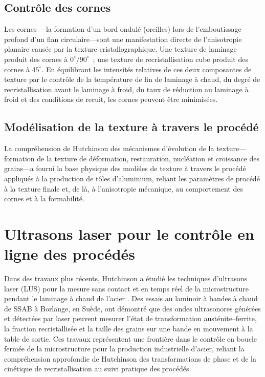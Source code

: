 \documentclass[11pt,a4paper]{article}
\begin{document}
\subsection{Contr\^ole des cornes}

Les \og cornes \fg{}---la formation d'un bord ondul\'e (oreilles) lors
de l'emboutissage profond d'un flan circulaire---sont une manifestation
directe de l'anisotropie planaire caus\'ee par la texture
cristallographique.  Une texture de laminage produit des cornes \`a
$0^\circ/90^\circ$~; une texture de recristallisation cube produit des
cornes \`a $45^\circ$.  En \'equilibrant les intensit\'es relatives de
ces deux composantes de texture par le contr\^ole de la temp\'erature de
fin de laminage \`a chaud, du degr\'e de recristallisation avant le
laminage \`a froid, du taux de r\'eduction au laminage \`a froid et des
conditions de recuit, les cornes peuvent \^etre minimis\'ees.

\subsection{Mod\'elisation de la texture \`a travers le proc\'ed\'e}

La compr\'ehension de Hutchinson des m\'ecanismes d'\'evolution de la
texture---formation de la texture de d\'eformation, restauration,
nucl\'eation et croissance des grains---a fourni la base physique des
mod\`eles de texture \`a travers le proc\'ed\'e appliqu\'es \`a la
production de t\^oles d'aluminium, reliant les param\`etres de
proc\'ed\'e \`a la texture finale et, de l\`a, \`a l'anisotropie
m\'ecanique, au comportement des cornes et \`a la formabilit\'e.

\section{Ultrasons laser pour le contr\^ole en ligne des proc\'ed\'es}
\label{sec:lus}

Dans des travaux plus r\'ecents, Hutchinson a \'etudi\'e les techniques
d'ultrasons laser (LUS) pour la mesure sans contact et en temps r\'eel
de la microstructure pendant le laminage \`a chaud de l'acier
\cite{Hutchinson2011LUS}.  Des essais au laminoir \`a bandes \`a chaud
de SSAB \`a Borl\"ange, en Su\`ede, ont d\'emontr\'e que des ondes
ultrasonores g\'en\'er\'ees et d\'etect\'ees par laser peuvent mesurer
l'\'etat de transformation aust\'enite--ferrite, la fraction
recristallis\'ee et la taille des grains sur une bande en mouvement \`a
la table de sortie.  Ces travaux repr\'esentent une fronti\`ere dans le
contr\^ole en boucle ferm\'ee de la microstructure pour la production
industrielle d'acier, reliant la compr\'ehension approfondie de
Hutchinson des transformations de phase et de la cin\'etique de
recristallisation au suivi pratique des proc\'ed\'es.
\end{document}
